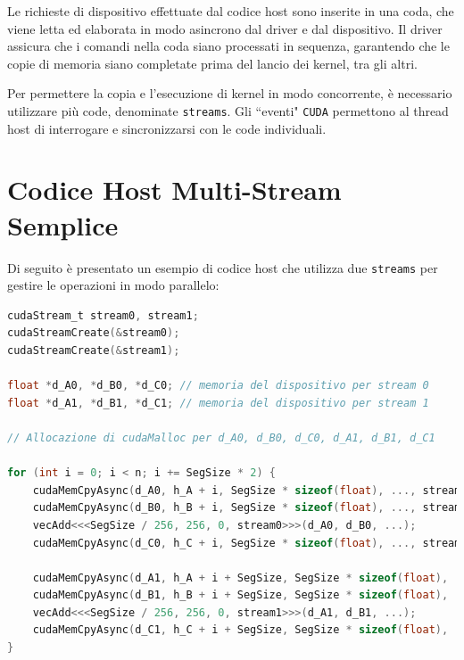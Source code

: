 Le richieste di dispositivo effettuate dal codice host sono inserite
in una coda, che viene letta ed elaborata in modo asincrono dal driver
e dal dispositivo. Il driver assicura che i comandi nella coda siano
processati in sequenza, garantendo che le copie di memoria siano
completate prima del lancio dei kernel, tra gli altri.

Per permettere la copia e l'esecuzione di kernel in modo concorrente, è
necessario utilizzare più code, denominate \texttt{streams}. Gli ``eventi"
\texttt{CUDA} permettono al thread host di interrogare e sincronizzarsi
con le code individuali.

\section*{Codice Host Multi-Stream Semplice}
Di seguito è presentato un esempio di codice host che utilizza due
\texttt{streams} per gestire le operazioni in modo parallelo:

\begin{lstlisting}[language=C]
cudaStream_t stream0, stream1;
cudaStreamCreate(&stream0);
cudaStreamCreate(&stream1);

float *d_A0, *d_B0, *d_C0; // memoria del dispositivo per stream 0
float *d_A1, *d_B1, *d_C1; // memoria del dispositivo per stream 1

// Allocazione di cudaMalloc per d_A0, d_B0, d_C0, d_A1, d_B1, d_C1

for (int i = 0; i < n; i += SegSize * 2) {
    cudaMemCpyAsync(d_A0, h_A + i, SegSize * sizeof(float), ..., stream0);
    cudaMemCpyAsync(d_B0, h_B + i, SegSize * sizeof(float), ..., stream0);
    vecAdd<<<SegSize / 256, 256, 0, stream0>>>(d_A0, d_B0, ...);
    cudaMemCpyAsync(d_C0, h_C + i, SegSize * sizeof(float), ..., stream0);

    cudaMemCpyAsync(d_A1, h_A + i + SegSize, SegSize * sizeof(float), ..., stream1);
    cudaMemCpyAsync(d_B1, h_B + i + SegSize, SegSize * sizeof(float), ..., stream1);
    vecAdd<<<SegSize / 256, 256, 0, stream1>>>(d_A1, d_B1, ...);
    cudaMemCpyAsync(d_C1, h_C + i + SegSize, SegSize * sizeof(float), ..., stream1);
}
\end{lstlisting}

